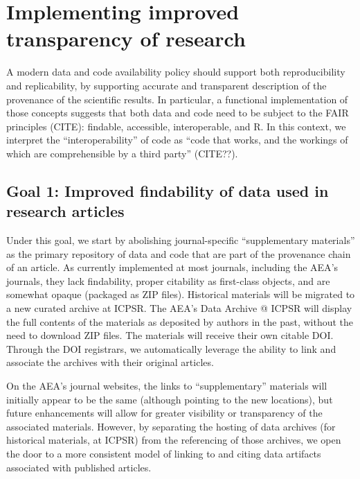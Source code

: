 \documentclass[AEJ]{AEA}
\begin{document}
\section{Implementing improved transparency of research}
A modern data and code availability policy should support both reproducibility and replicability, by supporting accurate and transparent description of the provenance of the scientific results. In particular, a functional implementation of those concepts suggests that both data and code need to be subject to the \ac{FAIR} principles (CITE): findable, accessible, interoperable, and R. In this context, we interpret the ``interoperability'' of code as ``code that works, and the workings of which are comprehensible by a third party'' (CITE??). 

\subsection{Goal 1: Improved findability of data used in research articles}

Under this goal, we start by abolishing journal-specific ``supplementary materials'' as the primary repository of data and code that are part of the provenance chain of an article. As currently implemented at most journals, including the \ac{AEA}'s journals, they lack findability, proper citability as first-class objects, and are somewhat opaque (packaged as ZIP files). Historical materials will be migrated to a new curated archive at ICPSR. The AEA's Data Archive @ ICPSR will display the full contents of the materials as deposited by authors in the past, without the need to download ZIP files. The materials will receive their own citable \ac{DOI}. Through the \ac{DOI} registrars, we automatically leverage the ability to link and associate the archives with their original articles. 

On the AEA's journal websites, the links to ``supplementary'' materials will initially appear to be the same (although pointing to the new locations), but future enhancements will allow for greater visibility or transparency of the associated materials. However, by separating the hosting of data archives (for historical materials, at ICPSR) from the referencing of those archives, we open the door to a more consistent model of linking to and citing data artifacts associated with published articles.
\end{document}
